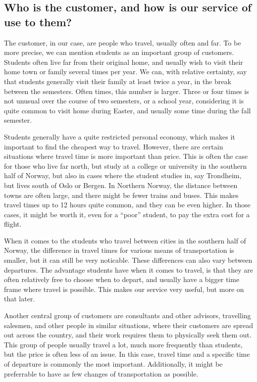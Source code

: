\subsection{Who is the customer, and how is our service of use to them?}

The customer, in our case, are people who travel, usually often and far. To be more precise, we can mention students as an important group of customers. Students often live far from their original home, and usually wish to visit their home town or family several times per year. We can, with relative certainty, say that students generally visit their family at least twice a year, in the break between the semesters. Often times, this number is larger. Three or four times is not unusual over the course of two semesters, or a school year, considering it is quite common to visit home during Easter, and usually some time during the fall semester.

Students generally have a quite restricted personal economy, which makes it important to find the cheapest way to travel. However, there are certain situations where travel time is more important than price. This is often the case for those who live far north, but study at a college or university in the southern half of Norway, but also in cases where the student studies in, say Trondheim, but lives south of Oslo or Bergen. In Northern Norway, the distance between towns are often large, and there might be fewer trains and buses. This makes travel times up to 12 hours quite common, and they can be even higher. In those cases, it might be worth it, even for a ``poor'' student, to pay the extra cost for a flight.

When it comes to the students who travel between cities in the southern half of Norway, the difference in travel times for various means of transportation is smaller, but it can still be very noticable. These differences can also vary between departures. The advantage students have when it comes to travel, is that they are often relatively free to choose when to depart, and usually have a bigger time frame where travel is possible. This makes our service very useful, but more on that later.

Another central group of customers are consultants and other advisors, travelling salesmen, and other people in similar situations, where their customers are spread out across the country, and their work requires them to physically seek them out. This group of people usually travel a lot, much more frequently than students, but the price is often less of an issue. In this case, travel time and a specific time of departure is commonly the most important. Additionally, it might be preferrable to have as few changes of transportation as possible.

